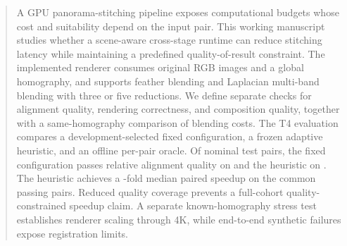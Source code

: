 \begin{abstract}
A GPU panorama-stitching pipeline exposes computational budgets whose cost and
suitability depend on the input pair. This working manuscript studies whether
a scene-aware cross-stage runtime can reduce stitching latency while maintaining
a predefined quality-of-result constraint. The implemented renderer consumes
original RGB images and a global homography, and supports feather blending and
Laplacian multi-band blending with three or five reductions. We define separate
checks for alignment quality, rendering correctness, and composition quality,
together with a same-homography comparison of blending costs. The T4 evaluation
compares a development-selected fixed configuration, a frozen adaptive heuristic,
and an offline per-pair oracle. Of \ChNominal{} nominal test pairs, the fixed
configuration passes relative alignment quality on \ChFixedPass{} and the
heuristic on \ChAdaptivePass{}. The heuristic achieves a \ChSpeedup{}-fold
median paired speedup on the \ChJoint{} common passing pairs. Reduced quality
coverage prevents a full-cohort quality-constrained speedup claim. A separate
known-homography stress test establishes renderer scaling through 4K, while
end-to-end synthetic failures expose registration limits.
\end{abstract}
